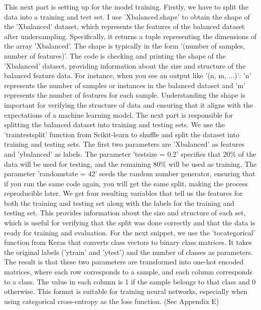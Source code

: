\documentclass[paper=a4, fontsize=11pt,twoside]{scrartcl}
\begin{document}
This next part is setting up for the model training. Firstly, we have to split the data into a training and test set. I use 'X\textunderscore balanced.shape' to obtain the shape of the 'X\textunderscore balanced' dataset, which represents the features of the balanced dataset after undersampling. Specifically, it returns a tuple representing the dimensions of the array 'X\textunderscore balanced'. The shape is typically in the form '(number of samples, number of features)'. The code is checking and printing the shape of the 'X\textunderscore balanced' dataset, providing information about the size and structure of the balanced feature data. For instance, when you see an output like '(n, m, ...)': 'n' represents the number of samples or instances in the balanced dataset and 'm' represents the number of features for each sample. Understanding the shape is important for verifying the structure of data and ensuring that it aligns with the expectations of a machine learning model. The next part is responsible for splitting the balanced dataset into training and testing sets. We use the 'train\textunderscore test\textunderscore split' function from Scikit-learn to shuffle and split the dataset into training and testing sets. The first two parameters are 'X\textunderscore balanced' as features and 'y\textunderscore balanced' as labels. The parameter 'test\textunderscore size = 0.2' specifies that 20\% of the data will be used for testing, and the remaining 80\% will be used as training. The parameter 'random\textunderscore state = 42' seeds the random number generator, ensuring that if you run the same code again, you will get the same split, making the process reproducible later. We get four resulting variables that tell us the features for both the training and testing set along with the labels for the training and testing set. This provides information about the size and structure of each set, which is useful for verifying that the split was done correctly and that the data is ready for training and evaluation. For the next snippet, we use the 'to\textunderscore categorical' function from Keras that converts class vectors to binary class matrices. It takes the original labels ('y\textunderscore train' and 'y\textunderscore test') and the number of classes as parameters. The result is that these two parameters are transformed into one-hot encoded matrices, where each row corresponds to a sample, and each column corresponds to a class. The value in each column is 1 if the sample belongs to that class and 0 otherwise. This format is suitable for training neural networks, especially when using categorical cross-entropy as the loss function. (See Appendix E) \\
\end{document}
